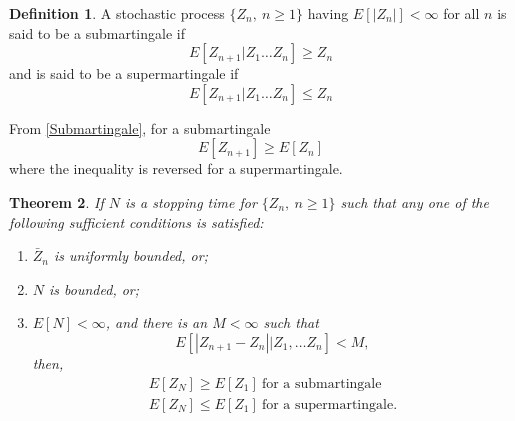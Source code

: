 \documentclass[a4paper,10pt]{article}
\theoremstyle{plain}
\newtheorem{thm}{Theorem}[section]
\theoremstyle{definition}
\newtheorem{defn}[thm]{Definition}
\theoremstyle{remark}
\begin{document}
\begin{defn}
A stochastic process $\{Z_n,~  n \geq 1\}$ having $E[|Z_n|]< \infty$ for all $n$ is said to be a submartingale if
\begin{equation}
\label{Submartingale}
E[Z_{n+1}|Z_1 \hdots Z_n] \geq Z_n
\end{equation}
and is said to be a supermartingale if
\begin{equation}
\label{Supermartingale}
E[Z_{n+1}|Z_1 \hdots Z_n] \leq Z_n
\end{equation}
\end{defn}
From \ref{Submartingale}, for a submartingale
\begin{equation*}
E[Z_{n+1}] \geq E[Z_n]
\end{equation*}
where the inequality is reversed for a supermartingale. 
\begin{thm}
\label{Stoppingtime_theorem}
If $N$ is a stopping time for $\{Z_n,~ n\geq 1\}$ such that any one of the following sufficient conditions is satisfied:
\begin{enumerate}
\item $\bar{Z}_n$ is uniformly bounded, or;
\item $N$ is bounded, or;
\item $E[N]< \infty$, and there is an $M < \infty$ such that
\begin{equation*}
E[|Z_{n+1}-Z_n| |Z_1, \hdots Z_n]<M,
\end{equation*}
then,
\begin{eqnarray*}
E[Z_N] \geq E[Z_1] ~ \text {for a submartingale}\\
E[Z_N] \leq E[Z_1] ~ \text {for a supermartingale}.
\end{eqnarray*}
\end{enumerate}
\end{thm}
\end{document}
